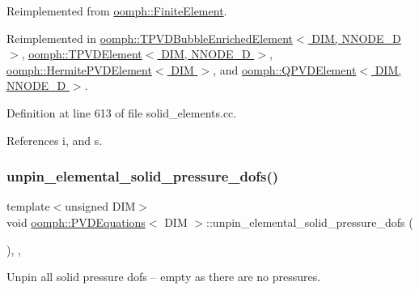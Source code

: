 Reimplemented from \hyperlink{classoomph_1_1FiniteElement_adfaee690bb0608f03320eeb9d110d48c}{oomph\+::\+Finite\+Element}.



Reimplemented in \hyperlink{classoomph_1_1TPVDBubbleEnrichedElement_a703ae35a4f6d398ec8bb125d0d656418}{oomph\+::\+T\+P\+V\+D\+Bubble\+Enriched\+Element$<$ D\+I\+M, N\+N\+O\+D\+E\+\_\+D $>$}, \hyperlink{classoomph_1_1TPVDElement_a439c64bf9eefec5c472dfe91099c2ffd}{oomph\+::\+T\+P\+V\+D\+Element$<$ D\+I\+M, N\+N\+O\+D\+E\+\_\+D $>$}, \hyperlink{classoomph_1_1HermitePVDElement_a4a8edf00d8c8b4fe61676fead8413ab9}{oomph\+::\+Hermite\+P\+V\+D\+Element$<$ D\+I\+M $>$}, and \hyperlink{classoomph_1_1QPVDElement_a063b9d709dc2476ed53c9a6ca7d7af22}{oomph\+::\+Q\+P\+V\+D\+Element$<$ D\+I\+M, N\+N\+O\+D\+E\+\_\+D $>$}.



Definition at line 613 of file solid\+\_\+elements.\+cc.



References i, and s.

\mbox{\label{classoomph_1_1PVDEquations_a3ed682fe4a6e0919cc6e0d9445174463}} 
\subsubsection{\texorpdfstring{unpin\+\_\+elemental\+\_\+solid\+\_\+pressure\+\_\+dofs()}{unpin\_elemental\_solid\_pressure\_dofs()}}
{\footnotesize\ttfamily template$<$unsigned D\+IM$>$ \\
void \hyperlink{classoomph_1_1PVDEquations}{oomph\+::\+P\+V\+D\+Equations}$<$ D\+IM $>$\+::unpin\+\_\+elemental\+\_\+solid\+\_\+pressure\+\_\+dofs (\begin{DoxyParamCaption}{ }\end{DoxyParamCaption})\hspace{0.3cm}{\ttfamily [inline]}, {\ttfamily [private]}, {\ttfamily [virtual]}}



Unpin all solid pressure dofs -- empty as there are no pressures. 



